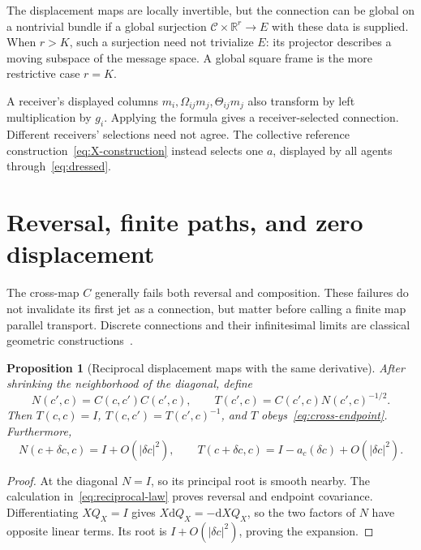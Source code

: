 \documentclass[11pt]{article}
\newtheorem{proposition}[theorem]{Proposition}
\newcommand{\R}{\mathbb R}
\newcommand{\dd}{\mathrm d}
\newcommand{\C}{\mathcal C}
\begin{document}
The displacement maps are locally invertible, but the connection can be global on a nontrivial bundle if a global surjection $\C\times\R^r\to E$ with these data is supplied. When $r>K$, such a surjection need not trivialize $E$: its projector describes a moving subspace of the message space. A global square frame is the more restrictive case $r=K$.

A receiver's displayed columns $m_i,\Omega_{ij}m_j,\Theta_{ij}m_j$ also transform by left multiplication by $g_i$. Applying the formula gives a receiver-selected connection. Different receivers' selections need not agree. The collective reference construction~\eqref{eq:X-construction} instead selects one $a$, displayed by all agents through~\eqref{eq:dressed}.

\section{Reversal, finite paths, and zero displacement}

The cross-map $C$ generally fails both reversal and composition. These failures do not invalidate its first jet as a connection, but matter before calling a finite map parallel transport. Discrete connections and their infinitesimal limits are classical geometric constructions~\cite{LeokMarsdenWeinstein2005}.

\begin{proposition}[Reciprocal displacement maps with the same derivative]
After shrinking the neighborhood of the diagonal, define
\begin{equation}
 N(c',c)=C(c,c')C(c',c),\qquad
 T(c',c)=C(c',c)N(c',c)^{-1/2}.
 \label{eq:discrete-reciprocal}
\end{equation}
Then $T(c,c)=I$, $T(c,c')=T(c',c)^{-1}$, and $T$ obeys~\eqref{eq:cross-endpoint}. Furthermore,
\begin{equation}
 N(c+\delta c,c)=I+O(|\delta c|^2),\qquad
 T(c+\delta c,c)=I-a_c(\delta c)+O(|\delta c|^2).
 \label{eq:same-jet}
\end{equation}
\end{proposition}
\begin{proof}
At the diagonal $N=I$, so its principal root is smooth nearby. The calculation in~\eqref{eq:reciprocal-law} proves reversal and endpoint covariance. Differentiating $XQ_X=I$ gives $X\dd Q_X=-\dd XQ_X$, so the two factors of $N$ have opposite linear terms. Its root is $I+O(|\delta c|^2)$, proving the expansion.
\end{proof}
\end{document}
